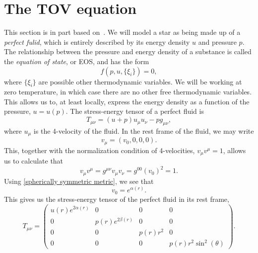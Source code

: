 \section{The TOV equation}
\label{section: TOV equation}

This section is in part based on~\autocite{carrollSpacetimeGeometryIntroduction2019,glendenningCompactStarsNuclear2012}.
We will model a star as being made up of a \emph{perfect fulid}, which is entirely described by its energy density $u$ and pressure $p$.
The relationship between the pressure and energy density of a substance is called the \emph{equation of state}, or EOS, and has the form
\begin{equation}
    \label{EOS}
    f(p, u, \{\xi_i\}) = 0,
\end{equation}
where $\{\xi_i\}$ are possible other thermodynamic variables.
We will be working at zero temperature, in which case there are no other free thermodynamic variables.
This allows us to, at least locally, express the energy density as a function of the pressure, $u = u(p)$.
The stress-energy tensor of a perfect fluid is
%
\begin{equation}
    T_{\mu \nu} = (u + p) u_\mu u_\nu - p g_{\mu \nu},
\end{equation} 
where $u_\mu$ is the 4-velocity of the fluid.
In the rest frame of the fluid, we may write 
\begin{equation}
    v_\mu = \left(v_0, 0, 0, 0\right).
\end{equation}
This, together with the normalization condition of 4-velocities, $v_\mu v^\mu = 1$, allows us to calculate that
%
\begin{equation}
    v_\mu v^\mu = g^{\mu \nu} v_\mu v_\nu = g^{00} (v_0)^2 = 1.
\end{equation}
%
Using \autoref{spherically symmetric metric}, we see that
\begin{equation}
    v_0 = e^{\alpha(r)}.
\end{equation}
%
This gives us the stress-energy tensor of the perfect fluid in its rest frame,
%
\begin{equation}
    T_{\mu \nu} 
    =
    \left(
        \begin{matrix}
            u{\left(r \right)} e^{2 \alpha{\left(r \right)}} & 0 & 0 & 0\\0 & 
            p{\left(r \right)} e^{2 \beta{\left(r \right)}} & 0 & 0\\
            0 & 0 & p{\left(r \right)} r^{2} & 0\\
            0 & 0 & 0 & p{\left(r \right)} r^{2} \sin^{2}{\left(\theta \right)}
        \end{matrix}
    \right).
\end{equation}
